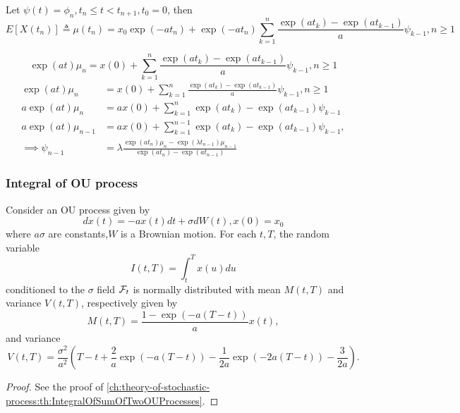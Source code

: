 \begin{refsection}
\begin{lemma}
	Let $\psi(t) = \phi_n, t_n\leq t < t_{n+1}, t_0 = 0$, then
	$$E[X(t_n)] \triangleq \mu(t_n) = x_0\exp(-at_n) + \exp(-at_n)\sum_{k=1}^{n} \frac{\exp(at_k) - \exp(at_{k-1})}{a}\psi_{k-1}, n\geq 1$$	
\end{lemma}


$$\exp(at)\mu_n = x(0) + \sum_{k=1}^{n} \frac{\exp(at_k) - \exp(at_{k-1})}{a}\psi_{k-1}, n\geq 1$$
\begin{align*}
\exp(at)\mu_n &= x(0) + \sum_{k=1}^{n} \frac{\exp(at_k) - \exp(at_{k-1})}{a}\psi_{k-1}, n\geq 1\\
a\exp(at)\mu_n &= a x(0) + \sum_{k=1}^{n} \exp(at_k) - \exp(at_{k-1})\psi_{k-1}\\
a\exp(at)\mu_{n-1} &= a x(0) + \sum_{k=1}^{n-1} \exp(at_k) - \exp(at_{k-1})\psi_{k-1}, \\
\implies \psi_{n-1} &= \lambda \frac{\exp(at_n)\mu_n - \exp(\lambda t_{n-1})\mu_{n-1}}{\exp(at_n) - \exp(at_{n-1})}
\end{align*}

\subsubsection{Integral of OU process}

\begin{lemma}
	Consider an OU process given by
	$$dx(t) = -a x(t)dt + \sigma dW(t), x(0) = x_{0}$$
	where $a \sigma$ are constants,$W$ is a Brownian motion.	
	For each $t,T$, the random variable
	$$I(t,T) = \int_t^T x(u) du$$
	conditioned to the $\sigma$ field $\mathcal{F}_t$ is normally distributed with mean $M(t,T)$ and variance $V(t,T)$, respectively given by
	$$M(t,T) = \frac{1-\exp(-a(T-t))}{a} x(t),$$
	and variance 
	$$V(t,T) = \frac{\sigma^2}{a^2}(T-t + \frac{2}{a}\exp(-a(T-t))-\frac{1}{2a}\exp(-2a(T-t))-\frac{3}{2a} ).$$
\end{lemma}
\begin{proof}
	See the proof of \autoref{ch:theory-of-stochastic-process:th:IntegralOfSumOfTwoOUProcesses}.	
\end{proof}


\end{refsection}
